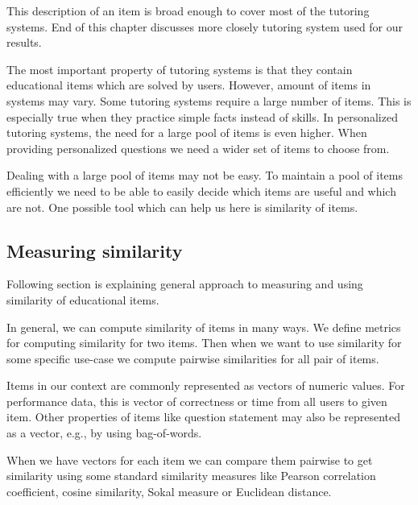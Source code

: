 \documentclass[
  digital, %
  table,   %
  nolof,     %
  nolot,     %
  nocover
]{fithesis3}
\begin{document}
This description of an item is broad enough to cover most of the tutoring systems. End of this chapter discusses more closely tutoring system used for our results.


The most important property of tutoring systems is that they contain educational items which are solved by users. However, amount of items in systems may vary. Some tutoring systems require a large number of items. This is especially true when they practice simple facts instead of skills. In personalized tutoring systems, the need for a large pool of items is even higher. When providing personalized questions we need a wider set of items to choose from.


Dealing with a large pool of items may not be easy. To maintain a pool of items efficiently we need to be able to easily decide which items are useful and which are not. One possible tool which can help us here is similarity of items.

\subsection{Measuring similarity}\label{measuring-similarity}

Following section is explaining general approach to measuring and using similarity of educational
items.


In general, we can compute similarity of items in many ways. We define metrics for computing similarity for two items. Then when we want to use similarity for some specific use-case we compute pairwise similarities for all pair of items.

Items in our context are commonly represented as vectors of numeric values. For performance data, this is vector of correctness or time from all users to given item. Other properties of items like question statement may also be represented as a vector, e.g., by using bag-of-words.

When we have vectors for each item we can compare them pairwise to get similarity using some standard similarity measures like Pearson correlation coefficient, cosine similarity, Sokal measure or Euclidean distance.

\end{document}
